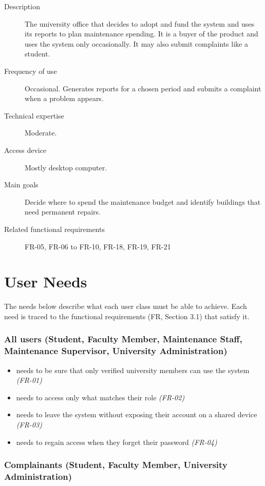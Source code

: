 \begin{description}
  \item[Description] The university office that decides to adopt and fund the system and uses its reports to plan maintenance spending. It is a buyer of the product and uses the system only occasionally. It may also submit complaints like a student.
  \item[Frequency of use] Occasional. Generates reports for a chosen period and submits a complaint when a problem appears.
  \item[Technical expertise] Moderate.
  \item[Access device] Mostly desktop computer.
  \item[Main goals] Decide where to spend the maintenance budget and identify buildings that need permanent repairs.
  \item[Related functional requirements] FR-05, FR-06 to FR-10, FR-18, FR-19, FR-21
\end{description}

\section{User Needs}
The needs below describe what each user class must be able to achieve. Each need is traced to the functional requirements (FR, Section 3.1) that satisfy it.

\subsubsection*{All users (Student, Faculty Member, Maintenance Staff, Maintenance Supervisor, University Administration)}

\begin{itemize}
  \item needs to be sure that only verified university members can use the system \textit{(FR-01)}
  \item needs to access only what matches their role \textit{(FR-02)}
  \item needs to leave the system without exposing their account on a shared device \textit{(FR-03)}
  \item needs to regain access when they forget their password \textit{(FR-04)}
\end{itemize}

\subsubsection*{Complainants (Student, Faculty Member, University Administration)}


